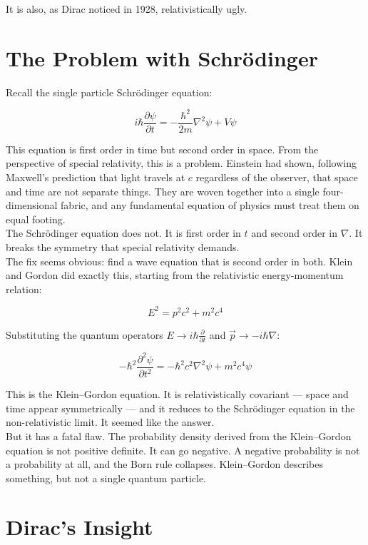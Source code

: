 \documentclass[krantz1,ChapterTOCs]{krantz}
\begin{document}
It is also, as Dirac noticed in 1928, relativistically ugly.\\

\section*{The Problem with Schr\"{o}dinger}

Recall the single particle Schr\"{o}dinger equation:

$$i\hbar\frac{\partial\psi}{\partial t} =
-\frac{\hbar^2}{2m}\nabla^2\psi + V\psi$$

This equation is first order in time but second order in space. From
the perspective of special relativity, this is a problem. Einstein
had shown, following Maxwell's prediction that light travels at $c$
regardless of the observer, that space and time are not separate
things. They are woven together into a single four-dimensional
fabric, and any fundamental equation of physics must treat them on
equal footing.\\

The Schr\"{o}dinger equation does not. It is first order in $t$ and
second order in $\nabla$. It breaks the symmetry that special
relativity demands.\\

The fix seems obvious: find a wave equation that is second order in
both. Klein and Gordon did exactly this, starting from the
relativistic energy-momentum relation:

$$E^2 = p^2c^2 + m^2c^4$$

Substituting the quantum operators $E \to i\hbar\frac{\partial}{\partial t}$
and $\vec{p} \to -i\hbar\nabla$:

$$-\hbar^2\frac{\partial^2\psi}{\partial t^2} =
-\hbar^2c^2\nabla^2\psi + m^2c^4\psi$$

This is the Klein--Gordon equation. It is relativistically covariant
--- space and time appear symmetrically --- and it reduces to the
Schr\"{o}dinger equation in the non-relativistic limit. It seemed
like the answer.\\

But it has a fatal flaw. The probability density derived from the
Klein--Gordon equation is not positive definite. It can go negative.
A negative probability is not a probability at all, and the Born
rule collapses. Klein--Gordon describes something, but not a single
quantum particle.\\

\section*{Dirac's Insight}
\end{document}
